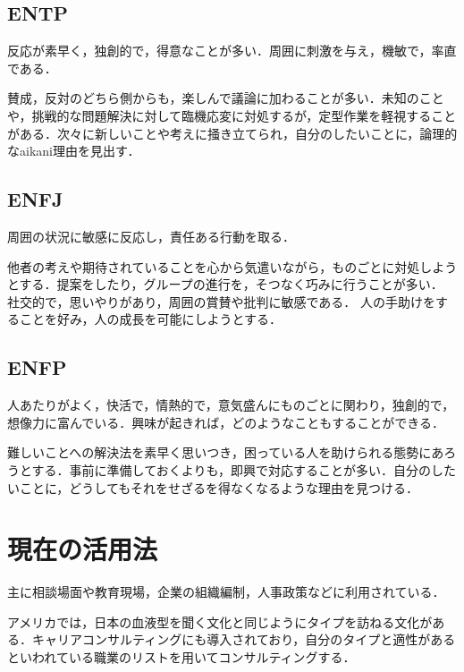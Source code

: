 \subsection{ENTP}

反応が素早く，独創的で，得意なことが多い．周囲に刺激を与え，機敏で，率直である．

賛成，反対のどちら側からも，楽しんで議論に加わることが多い．未知のことや，挑戦的な問題解決に対して臨機応変に対処するが，定型作業を軽視することがある．次々に新しいことや考えに掻き立てられ，自分のしたいことに，論理的なaikani理由を見出す．
\subsection{ENFJ}

周囲の状況に敏感に反応し，責任ある行動を取る．

他者の考えや期待されていることを心から気遣いながら，ものごとに対処しようとする．提案をしたり，グループの進行を，そつなく巧みに行うことが多い．
社交的で，思いやりがあり，周囲の賞賛や批判に敏感である．
人の手助けをすることを好み，人の成長を可能にしようとする．
\subsection{ENFP}

人あたりがよく，快活で，情熱的で，意気盛んにものごとに関わり，独創的で，想像力に富んでいる．興味が起きれば，どのようなこともすることができる．

難しいことへの解決法を素早く思いつき，困っている人を助けられる態勢にあろうとする．事前に準備しておくよりも，即興で対応することが多い．自分のしたいことに，どうしてもそれをせざるを得なくなるような理由を見つける．
\newpage

\section{現在の活用法}
主に相談場面や教育現場，企業の組織編制，人事政策などに利用されている\cite{110001230195}．

アメリカでは，日本の血液型を聞く文化と同じようにタイプを訪ねる文化がある．キャリアコンサルティングにも導入されており，自分のタイプと適性があるといわれている職業のリストを用いてコンサルティングする．


